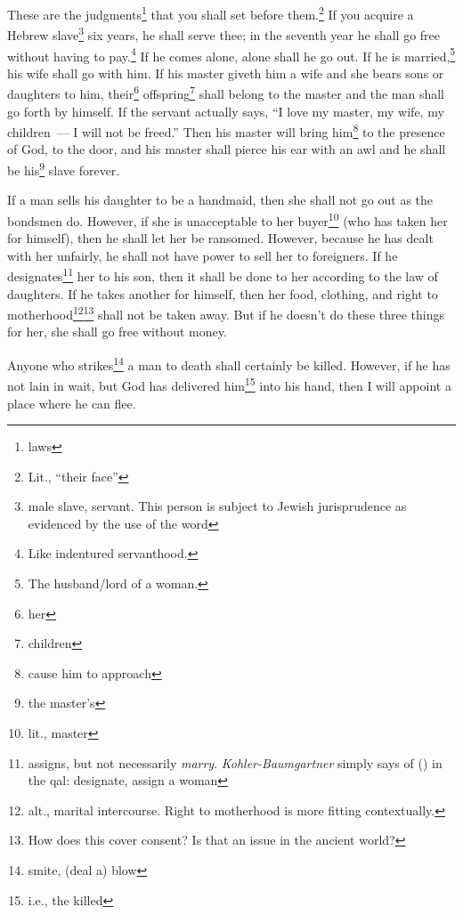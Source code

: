 
\begin{inparaenum}
     These are the judgments\footnote{laws} that you shall set before them.\footnote{Lit., ``their face''}%
     If you acquire a Hebrew slave\footnote{male slave, servant. This person is subject to Jewish jurisprudence as evidenced by the use of the word } six years, he shall serve thee; in the seventh year he shall go free without having to pay.\footnote{Like indentured servanthood.}%
     If he comes alone, alone shall he go out. If he is married,\footnote{The husband/lord of a woman.} his wife shall go with him.%
     If his master giveth him a wife and she bears sons or daughters to him, their\footnote{her} offspring\footnote{children} shall belong to the master and the man shall go forth by himself.%
     If the servant actually says, ``I love my master, my wife, my children~--- I will not be freed.''%
     Then his master will bring him\footnote{cause him to approach} to the presence of God, to the door, and his master shall pierce his ear with an awl and he shall be his\footnote{the master's} slave forever.%
    
     If a man sells his daughter to be a handmaid, then she shall not go out as the bondsmen do.%
     However, if she is unacceptable to her buyer\footnote{lit., master} (who has taken her for himself), then he shall let her be ransomed. However, because he has dealt with her unfairly, he shall not have power to sell her to foreigners.%
     If he designates\footnote{assigns, but not necessarily \textit{marry}. \textit{Kohler-Baumgartner} simply says of  () in the qal: designate, assign a woman} her to his son, then it shall be done to her according to the law of daughters.%
     If he takes another for himself, then her food, clothing, and right to motherhood\footnote{alt., marital intercourse. Right to motherhood is more fitting contextually.}\footnote{How does this cover consent? Is that an issue in the ancient world?} shall not be taken away.%
     But if he doesn't do these three things for her, she shall go free without money.%
    
     Anyone who strikes\footnote{smite, (deal a) blow} a man to death shall certainly be killed.%
     However, if he has not lain in wait, but God has delivered him\footnote{i.e., the killed} into his hand, then I will appoint a place where he can flee.%
    

\end{inparaenum}
